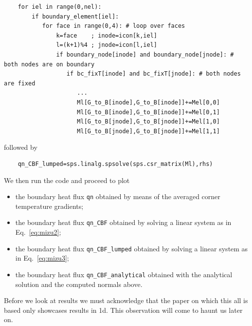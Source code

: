 \begin{lstlisting}
    for iel in range(0,nel):
        if boundary_element[iel]:
           for face in range(0,4): # loop over faces
               k=face    ; inode=icon[k,iel]
               l=(k+1)%4 ; jnode=icon[l,iel]
               if boundary_node[inode] and boundary_node[jnode]: # both nodes are on boundary
                  if bc_fixT[inode] and bc_fixT[jnode]: # both nodes are fixed
                     ...
                     Ml[G_to_B[inode],G_to_B[inode]]+=Mel[0,0]
                     Ml[G_to_B[inode],G_to_B[inode]]+=Mel[0,1]
                     Ml[G_to_B[jnode],G_to_B[jnode]]+=Mel[1,0]
                     Ml[G_to_B[jnode],G_to_B[jnode]]+=Mel[1,1]
\end{lstlisting}
followed by 
\begin{lstlisting}
    qn_CBF_lumped=sps.linalg.spsolve(sps.csr_matrix(Ml),rhs)
\end{lstlisting}

We then run the code and proceed to plot
\begin{itemize}
\item the boundary heat flux \lstinline{qn} obtained by means of the averaged corner 
temperature gradients;
\item the boundary heat flux \lstinline{qn_CBF} obtained by solving a linear system as in Eq.~\eqref{eq:mizu2};
\item the boundary heat flux \lstinline{qn_CBF_lumped} obtained by solving a linear system as in Eq.~\eqref{eq:mizu3};
\item the boundary heat flux \lstinline{qn_CBF_analytical} obtained with the analytical solution and the 
computed normals above. 
\end{itemize}

Before we look at results we must acknowledge that the paper on which this all is based \cite{mizu86}
only showcases results in 1d. This observation will come to haunt us later on. 

